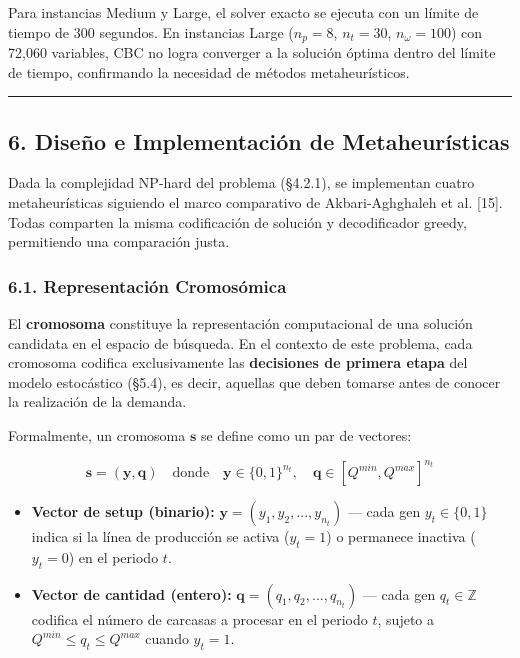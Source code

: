 \documentclass[
  spanish,
  12pt,
]{article}
\providecommand{\tightlist}{%
  \setlength{\itemsep}{0pt}\setlength{\parskip}{0pt}}
\begin{document}
Para instancias Medium y Large, el solver exacto se ejecuta con un
límite de tiempo de 300 segundos. En instancias Large (\(n_p=8\),
\(n_t=30\), \(n_\omega=100\)) con 72,060 variables, CBC no logra
converger a la solución óptima dentro del límite de tiempo, confirmando
la necesidad de métodos metaheurísticos.

\begin{center}\rule{0.5\linewidth}{0.5pt}\end{center}

\subsection{6. Diseño e Implementación de
Metaheurísticas}\label{diseuxf1o-e-implementaciuxf3n-de-metaheuruxedsticas}

Dada la complejidad NP-hard del problema (§4.2.1), se implementan cuatro
metaheurísticas siguiendo el marco comparativo de Akbari-Aghghaleh et
al. {[}15{]}. Todas comparten la misma codificación de solución y
decodificador greedy, permitiendo una comparación justa.

\subsubsection{6.1. Representación
Cromosómica}\label{representaciuxf3n-cromosuxf3mica}

El \textbf{cromosoma} constituye la representación computacional de una
solución candidata en el espacio de búsqueda. En el contexto de este
problema, cada cromosoma codifica exclusivamente las \textbf{decisiones
de primera etapa} del modelo estocástico (§5.4), es decir, aquellas que
deben tomarse antes de conocer la realización de la demanda.

Formalmente, un cromosoma \(\mathbf{s}\) se define como un par de
vectores:

\begin{equation}
\mathbf{s} = (\mathbf{y}, \mathbf{q}) \quad \text{donde} \quad \mathbf{y} \in \{0,1\}^{n_t}, \quad \mathbf{q} \in [Q^{min}, Q^{max}]^{n_t}
\end{equation}

\begin{itemize}
\tightlist
\item
  \textbf{Vector de setup (binario):}
  \(\mathbf{y} = (y_1, y_2, ..., y_{n_t})\) --- cada gen
  \(y_t \in \{0, 1\}\) indica si la línea de producción se activa
  (\(y_t = 1\)) o permanece inactiva (\(y_t = 0\)) en el periodo \(t\).
\item
  \textbf{Vector de cantidad (entero):}
  \(\mathbf{q} = (q_1, q_2, ..., q_{n_t})\) --- cada gen
  \(q_t \in \mathbb{Z}\) codifica el número de carcasas a procesar en el
  periodo \(t\), sujeto a \(Q^{min} \leq q_t \leq Q^{max}\) cuando
  \(y_t = 1\).
\end{itemize}
\end{document}
